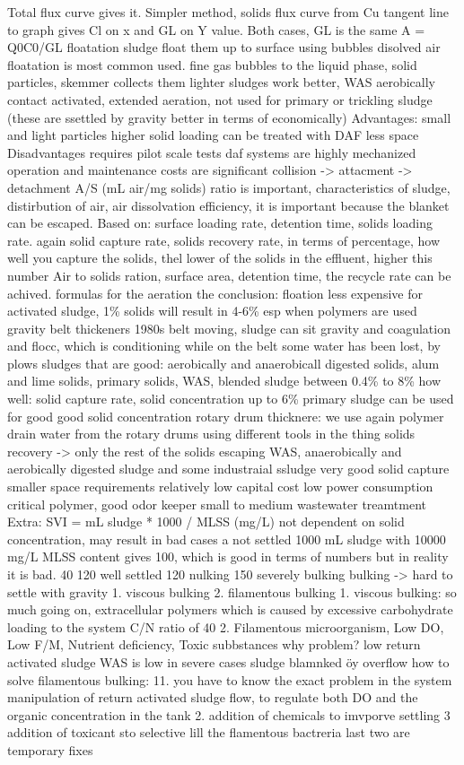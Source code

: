 \documentclass[12pt]{article}
\begin{document}
Total flux curve gives it. Simpler method, solids flux curve from Cu tangent line to graph gives Cl on x and GL on Y value. Both cases, GL is the same
A = Q0C0/GL
floatation sludge
float them up to surface using bubbles
disolved air floatation is most common used.
fine gas bubbles to the liquid phase, solid particles, skemmer collects them
lighter sludges work better, WAS aerobically contact activated, extended aeration, not used for primary  or trickling sludge (these are ssettled by gravity better in terms of economically)
Advantages:
small and light particles
higher solid loading can be treated with DAF
less space
Disadvantages
requires pilot scale tests
daf systems are highly mechanized
operation and maintenance costs are significant
collision -> attacment -> detachment
A/S (mL air/mg solids) ratio is important, characteristics of sludge, distirbution of air, air dissolvation efficiency, it is important because the blanket can be escaped.
Based on: surface loading rate, detention time, solids loading rate.
again solid capture rate, solids recovery rate, in terms of percentage, how well you capture the solids, thel lower of the solids in the effluent, higher this number
Air to solids ration, surface area, detention time, the recycle rate can be achived.
formulas for the aeration
the conclusion: floation less expensive for activated sludge, 1\% solids will result in 4-6\% esp when polymers are used
gravity belt thickeners
1980s
belt moving, sludge can sit
gravity and coagulation and flocc, which is conditioning
while on the belt some water has been lost, by plows
sludges that are good: aerobically and anaerobicall digested solids, alum and lime solids, primary solids, WAS, blended sludge between 0.4\% to 8\%
how well: solid capture rate, solid concentration up to 6\%
primary sludge can be used for good good solid concentration
rotary drum thicknere:
we use again polymer
drain water from the rotary drums using different tools in the thing
solids recovery -> only the rest of the solids escaping
WAS, anaerobically and aerobically digested sludge and some industraial ssludge
very good solid capture
smaller space requirements relatively low capital cost low power consumption
critical polymer, good odor keeper
small to medium wastewater treamtment
Extra:
SVI = mL sludge * 1000 / MLSS (mg/L)
not dependent on solid concentration, may result in bad cases
a not settled 1000 mL sludge with 10000 mg/L MLSS content gives 100, which is good in terms of numbers but in reality it is bad.
40 120 well settled
120 nulking
150 severely bulking
bulking -> hard to settle with gravity
1. viscous bulking
2. filamentous bulking
1. viscous bulking: so much going on, extracellular polymers which is caused by excessive carbohydrate loading to the system C/N ratio of 40
2. Filamentous microorganism, Low DO, Low F/M, Nutrient deficiency, Toxic subbstances
why problem?
low return activated sludge
WAS is low
in severe cases sludge blamnked öy overflow
how to solve filamentous bulking:
11. you have to know the exact problem in the system
manipulation of return activated sludge flow, to regulate both DO and the organic concentration in the tank
2. addition of chemicals to imvporve settling
3 addition of toxicant sto selective lill the flamentous bactreria
last two are temporary fixes
\end{document}

